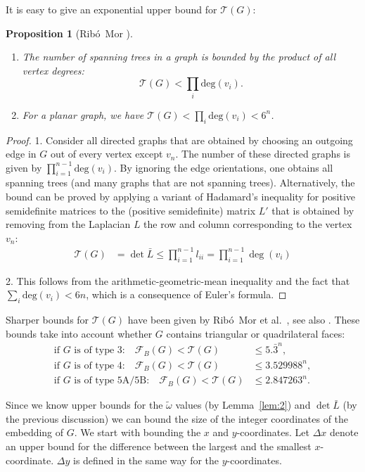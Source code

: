 \documentclass{article}
\theoremstyle{plain} \newtheorem{thm}{Theorem}[section]
\newtheorem{prop}{Proposition}
\newcommand{\ot}{\tilde{\omega}}
\begin{document}
It is easy to give an exponential upper bound for $\mathcal{T}(G)$:
\begin{prop}[Rib\'o~Mor \cite{r-rcpps-06}]
\begin{enumerate}
\item The number of spanning trees in a graph is bounded by the product of all vertex degrees:
\[\mathcal{T}(G) <  \prod_i \mathrm{deg}(v_i).\]
\item For a planar graph, we have $\mathcal{T}(G) < \prod_i \mathrm{deg}(v_i)< 6^n$.
\end{enumerate}
\end{prop}
\begin{proof}
1. Consider all
 directed graphs that are obtained by choosing
an outgoing edge in $G$ out of every vertex except $v_n$. The number
of these directed graphs is given by $\prod_{i=1}^{n-1} \mathrm{deg}(v_i)$.
By ignoring the edge orientations, one obtains all spanning trees
(and many graphs that are not spanning trees). 
Alternatively, the bound can be proved by applying a variant of Hadamard's
inequality for positive semidefinite matrices 
\cite[page 176]{z-mt-99} to the (positive semidefinite) matrix $L'$
that is obtained by removing from the Laplacian $L$ the row and
column corresponding to the vertex $v_n$:
\begin{align*}
 \mathcal{T}(G)&
=\det\bar L
\le 
\prod_{i=1}^{n-1} l_{ii}=\prod_{i=1}^{n-1} \deg(v_i)
\end{align*}


2. This follows from the arithmetic-geometric-mean inequality and the
fact that 
$\sum_i \mathrm{deg}(v_i)< 6n$, which is a consequence of
Euler's formula.
\end{proof}
Sharper bounds for $\mathcal{T}(G)$ have been given by
{Rib\'o~Mor} et al.~\cite{rry-abnst-09}, see also
\cite{r-rcpps-06,r-nstpg-05}.
These bounds take into account whether $G$ contains triangular or
quadrilateral faces:
\begin{align*}
\mbox{if $G$ is of type 3:} \quad  \mathcal{F}_B(G) <  \mathcal{T}(G) & \leq   5.\bar{3}^n, \\
\mbox{if $G$ is of type 4:} \quad  \mathcal{F}_B(G) <  \mathcal{T}(G) & \leq  3.529988^n,   \\
\mbox{if $G$ is of type 5A/5B:} \quad  \mathcal{F}_B(G) <  \mathcal{T}(G) & \leq  2.847263^n.
\end{align*}


Since we know upper bounds for the $\ot$ values (by Lemma~\ref{lem:2}) and $\det \bar L$ (by 
the previous discussion) we can bound the size of the integer coordinates of the embedding
of $G$. We start with bounding the $x$ and $y$-coordinates. Let $\Delta x$ 
denote an upper bound for 
the difference between the largest and the smallest $x$-coordinate. $\Delta y$ is defined
in the same way for the $y$-coordinates.
\end{document}
